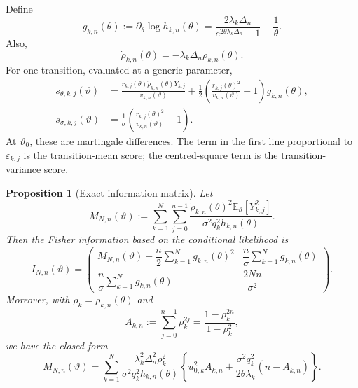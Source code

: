 \documentclass[11pt]{article}
\newtheorem{proposition}[assumption]{Proposition}
\theoremstyle{remark}
\newcommand{\E}{\mathbb E}
\newcommand{\1}{\mathbf 1}
\newcommand{\vart}{\vartheta}
\newcommand{\vzero}{\vartheta_0}
\begin{document}
Define
\begin{equation}\label{eq:g}
 g_{k,n}(\theta)
 :=\partial_\theta\log h_{k,n}(\theta)
 =\frac{2\lambda_k\Delta_n}
 {e^{2\theta\lambda_k\Delta_n}-1}
 -\frac1\theta.
\end{equation}
Also,
\begin{equation}\label{eq:rho-derivative}
 \dot\rho_{k,n}(\theta)
 =-\lambda_k\Delta_n\rho_{k,n}(\theta).
\end{equation}
For one transition, evaluated at a generic parameter,
\begin{align}
 s_{\theta,k,j}(\vart)
 &=\frac{r_{k,j}(\theta)\dot\rho_{k,n}(\theta)Y_{k,j}}
 {v_{k,n}(\vart)}
 +\frac12\left(
 \frac{r_{k,j}(\theta)^2}{v_{k,n}(\vart)}-1
 \right)g_{k,n}(\theta),\label{eq:score-theta}\\
 s_{\sigma,k,j}(\vart)
 &=\frac1\sigma\left(
 \frac{r_{k,j}(\theta)^2}{v_{k,n}(\vart)}-1
 \right).\label{eq:score-sigma}
\end{align}
At $\vzero$, these are martingale differences.  The term in the first line proportional to $\varepsilon_{k,j}$ is the transition-mean score; the centred-square term is the transition-variance score.

\begin{proposition}[Exact information matrix]\label{prop:exact-info}
Let
\begin{equation}\label{eq:M}
 M_{N,n}(\vart)
 :=\sum_{k=1}^N\sum_{j=0}^{n-1}
 \frac{\dot\rho_{k,n}(\theta)^2\E_\vart[Y_{k,j}^2]}
 {\sigma^2q_k^2h_{k,n}(\theta)}.
\end{equation}
Then the Fisher information based on the conditional likelihood is
\begin{equation}\label{eq:info-exact}
 I_{N,n}(\vart)
 =\begin{pmatrix}
 M_{N,n}(\vart)+\dfrac n2\sum_{k=1}^Ng_{k,n}(\theta)^2
 &\dfrac n\sigma\sum_{k=1}^Ng_{k,n}(\theta)\\[2mm]
 \dfrac n\sigma\sum_{k=1}^Ng_{k,n}(\theta)
 &\dfrac{2Nn}{\sigma^2}
 \end{pmatrix}.
\end{equation}
Moreover, with $\rho_k=\rho_{k,n}(\theta)$ and
\[
 A_{k,n}:=\sum_{j=0}^{n-1}\rho_k^{2j}
 =\frac{1-\rho_k^{2n}}{1-\rho_k^2},
\]
we have the closed form
\begin{equation}\label{eq:M-closed}
 M_{N,n}(\vart)
 =\sum_{k=1}^N
 \frac{\lambda_k^2\Delta_n^2\rho_k^2}
 {\sigma^2q_k^2h_{k,n}(\theta)}
 \left\{
 u_{0,k}^2A_{k,n}
 +\frac{\sigma^2q_k^2}{2\theta\lambda_k}
 (n-A_{k,n})
 \right\}.
\end{equation}
\end{proposition}
\end{document}
